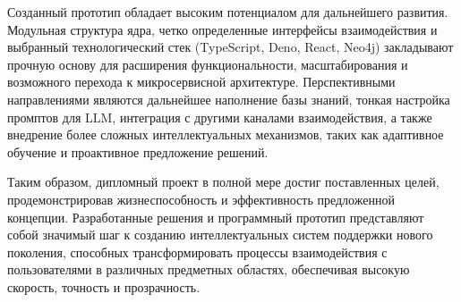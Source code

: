 Созданный прототип обладает высоким потенциалом для дальнейшего развития. Модульная структура ядра, четко определенные интерфейсы взаимодействия и выбранный технологический стек (TypeScript, Deno, React, Neo4j) закладывают прочную основу для расширения функциональности, масштабирования и возможного перехода к микросервисной архитектуре. Перспективными направлениями являются дальнейшее наполнение базы знаний, тонкая настройка промптов для LLM, интеграция с другими каналами взаимодействия, а также внедрение более сложных интеллектуальных механизмов, таких как адаптивное обучение и проактивное предложение решений.

Таким образом, дипломный проект в полной мере достиг поставленных целей, продемонстрировав жизнеспособность и эффективность предложенной концепции. Разработанные решения и программный прототип представляют собой значимый шаг к созданию интеллектуальных систем поддержки нового поколения, способных трансформировать процессы взаимодействия с пользователями в различных предметных областях, обеспечивая высокую скорость, точность и прозрачность.